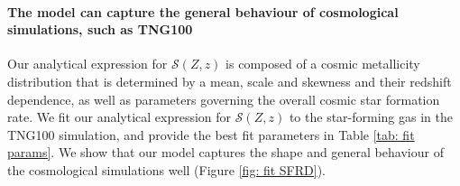 \documentclass[twocolumn]{aastex631}
\newcommand{\SFRDzZ}{\ensuremath{\mathcal{S}(Z,z)}\xspace}
\begin{document}
\paragraph{The model can capture the general behaviour of cosmological simulations, such as TNG100}
Our analytical expression for \SFRDzZ is composed of a cosmic metallicity distribution that is determined by a mean, scale and skewness and their redshift dependence, as well as parameters governing the overall cosmic star formation rate. We fit our analytical expression for \SFRDzZ to the star-forming gas in the TNG100 simulation, and provide the best fit parameters in Table \ref{tab: fit params}. 
We show that our model captures the shape and general behaviour of the cosmological simulations well (Figure \ref{fig: fit SFRD}). 
\end{document}
